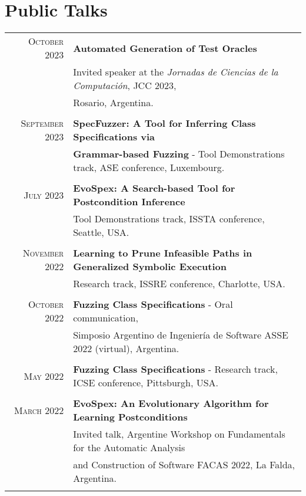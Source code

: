 \documentclass[a4paper,10pt]{article} %
\begin{document}
\section{Public Talks}

\begin{longtable}{rl}
\textsc{October} 2023  & \textbf{Automated Generation of Test Oracles} \\ 
& Invited speaker at the \textit{Jornadas de Ciencias de la Computación}, JCC 2023, \\ 
& Rosario, Argentina. \\ & \\

\textsc{September} 2023  & \textbf{SpecFuzzer: A Tool for Inferring Class Specifications via} \\ 
& \textbf{Grammar-based Fuzzing} - Tool Demonstrations track, ASE conference, Luxembourg. \\ & \\

\textsc{July} 2023 & \textbf{EvoSpex: A Search-based Tool for Postcondition Inference} \\ 
& Tool Demonstrations track, ISSTA conference, Seattle, USA. \\ & \\

\textsc{November} 2022 & \textbf{Learning to Prune Infeasible Paths in Generalized Symbolic Execution} \\
& Research track, ISSRE conference, Charlotte, USA. \\ & \\

\textsc{October} 2022 & \textbf{Fuzzing Class Specifications} - Oral communication, \\ 
& Simposio Argentino de Ingeniería de Software ASSE 2022 (virtual), Argentina. \\ & \\

\textsc{May} 2022 & \textbf{Fuzzing Class Specifications} - Research track, ICSE conference, Pittsburgh, USA. \\ & \\

\textsc{March} 2022 & \textbf{EvoSpex: An Evolutionary Algorithm for Learning Postconditions} \\ 
& Invited talk, Argentine Workshop on Fundamentals for the Automatic Analysis \\ 
& and Construction of Software FACAS 2022, La Falda, Argentina. \\ & \\


\end{longtable}
\end{document}
